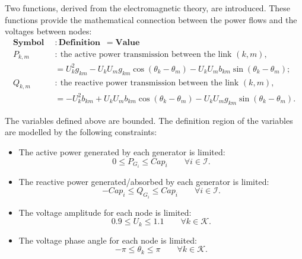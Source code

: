 \vspace{3mm}
Two functions, derived from the electromagnetic theory, are introduced. These functions provide the mathematical connection between the power flows and the voltages between nodes: 
\begin{align*}
\textbf{Symbol} \enspace &: \textbf{Definition} \enspace = \textbf{Value}\\
P_{k,m} &: \ \text{the active power transmission between the link } (k,m), \\
        &= U^2_{k} g_{km} − U_{k} U_{m} g_{km} \cos(\theta_k − \theta_m) − U_k U_m b_{km} \sin(\theta_k − \theta_m);\\
Q_{k,m} &: \ \text{the reactive power transmission between the link } (k,m), \\
        &= −U^2_k b_{km} + U_k U_m b_{km} \cos(\theta_k − \theta_m) − U_k U_m g_{km} \sin(\theta_k − \theta_m).
\end{align*}

\vspace{3mm}
The variables defined above are bounded. The definition region of the variables are modelled by the following constraints: 
\begin{itemize}
    \item The active power generated by each generator is limited:
    \begin{equation*}
        0 \leq P_{G_i} \leq Cap_i  \qquad \forall i \in \mathcal{I}.
    \end{equation*}
    
    \item The reactive power generated/absorbed by each generator is limited:
    \begin{equation*}
        -Cap_i \leq Q_{G_i} \leq Cap_i  \qquad \forall i \in \mathcal{I}.
    \end{equation*}
    
    \item The voltage amplitude for each node is limited:
    \begin{equation*}
        0.9 \leq U_k \leq 1.1  \qquad \forall k \in \mathcal{K}.
    \end{equation*}
    
    \item The voltage phase angle for each node is limited:
    \begin{equation*}
        -\pi \leq \theta_k \leq \pi  \qquad \forall k \in \mathcal{K}.
    \end{equation*}
\end{itemize}

